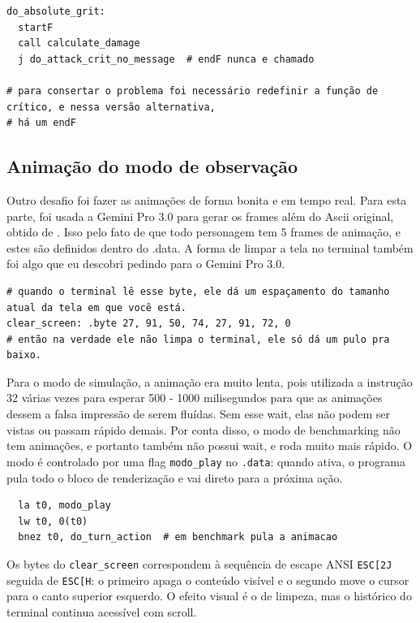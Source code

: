 \documentclass[AMA,twocolumn]{USG}
\begin{document}
\begin{verbatim}
do_absolute_grit:
  startF
  call calculate_damage
  j do_attack_crit_no_message  # endF nunca e chamado

# para consertar o problema foi necessário redefinir a função de crítico, e nessa versão alternativa,
# há um endF
\end{verbatim}

\subsection{Animação do modo de observação}
Outro desafio foi fazer as animações de forma bonita e em tempo real. Para esta parte, foi usada a Gemini Pro 3.0 para 
gerar os frames além do Ascii original, obtido de \cite{emojicombos_undertale}. Isso pelo fato de que todo personagem tem 5 frames de animação, e estes são definidos
dentro do .data. A forma de limpar a tela no terminal também foi algo que eu descobri pedindo para o Gemini Pro 3.0.

\begin{verbatim}
# quando o terminal lê esse byte, ele dá um espaçamento do tamanho atual da tela em que você está.
clear_screen: .byte 27, 91, 50, 74, 27, 91, 72, 0
# então na verdade ele não limpa o terminal, ele só dá um pulo pra baixo.
\end{verbatim}

Para o modo de simulação, a animação era muito lenta, pois utilizada a instrução 32 várias vezes para esperar 500 - 1000 milisegundos
para que as animações dessem a falsa impressão de serem fluídas. Sem esse wait, elas não podem ser vistas ou passam rápido demais. 
Por conta disso, o modo de benchmarking não tem animações, e portanto também não possui wait, e roda muito mais rápido. O modo é controlado por uma flag \texttt{modo\_play} no \texttt{.data}: quando ativa, o programa pula todo o bloco de renderização e vai direto para a próxima ação.

\begin{verbatim}
  la t0, modo_play
  lw t0, 0(t0)
  bnez t0, do_turn_action  # em benchmark pula a animacao
\end{verbatim}

Os bytes do \texttt{clear\_screen} correspondem à sequência de escape ANSI \texttt{ESC[2J} seguida de \texttt{ESC[H}: o primeiro apaga o conteúdo visível e o segundo move o cursor para o canto superior esquerdo. O efeito visual é o de limpeza, mas o histórico do terminal continua acessível com scroll.
\end{document}
